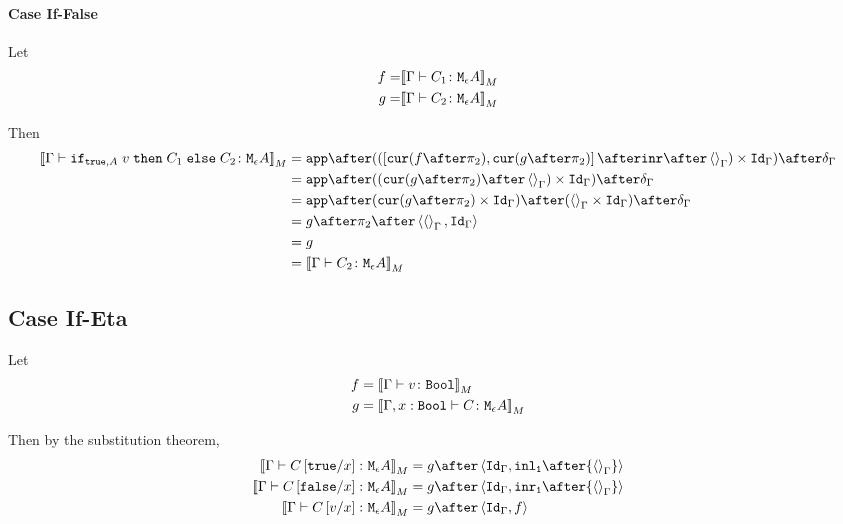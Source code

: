 {    \paragraph{Case If-False}
    Let
    \begin{align}
        f = &{\bf [\![}\Gamma \vdash C_1 \colon \texttt{M}_{\epsilon}{A}{\bf ]\!]}_M\\
        g = &{\bf [\![}\Gamma \vdash C_2 \colon \texttt{M}_{\epsilon}{A}{\bf ]\!]}_M\\
    \end{align}

    Then
    \begin{equation}
        \begin{split}
            \deno{\gtyperelation{\ifthenelse{\t}{A}{v}{C_1}{C_2}}{\mea}} & = \ifMorph{\inr\after\term{\G}}{f}{g} \\
            & = \app\after((\cur{g\after\pp}\after\term{\G})\times\idg)\after\diag{\G}\\
            & = \app\after(\cur{g\after\pp}\times\idg)\after(\term{\G}\times\idg)\after\diag{\G}\\
            & = g\after\pp\after\pr{\term{\G}}{\idg}\\
            & = g \\
            & = \deno{\gtyperelation{C_2}{\mea}}\\
        \end{split}
    \end{equation}

    \subsection{Case If-Eta}
        Let 
        \begin{align}
            f & = {\bf [\![}\Gamma \vdash v \colon \texttt{Bool}{\bf ]\!]}_M \\
            g & = {\bf [\![}\Gamma, x: \texttt{Bool} \vdash C \colon \texttt{M}_{\epsilon}{A}{\bf ]\!]}_M \\
        \end{align}


        Then by the substitution theorem,
        \begin{align}
            \deno{\typerelation{\G}{C\ssub{x}{\t}}{\mea}} & = g\after\pr{\idg}{\inl_\1\after{\term{\G}}}\\
            \deno{\typerelation{\G}{C\ssub{x}{\f}}{\mea}} & = g\after\pr{\idg}{\inr_\1\after{\term{\G}}}\\
            \deno{\gtyperelation{C\ssub{x}{v}}{\mea}} & = g\after\pr{\idg}{f}
        \end{align}

}
